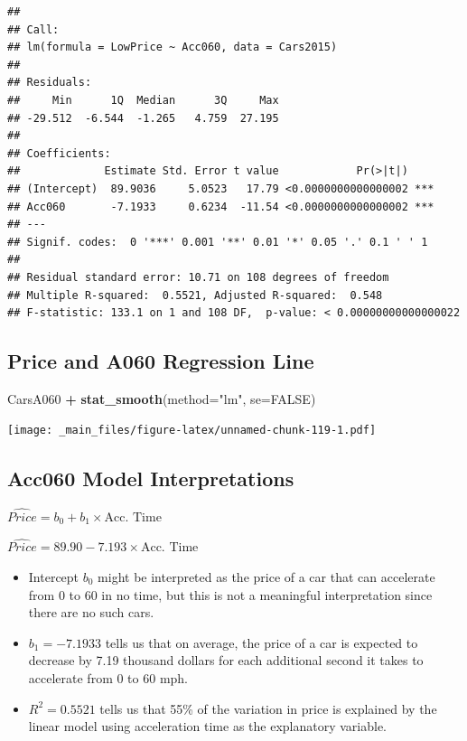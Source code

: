 \documentclass[]{book}
\newenvironment{Shaded}{\begin{snugshade}}{\end{snugshade}}
\newcommand{\KeywordTok}[1]{\textcolor[rgb]{0.13,0.29,0.53}{\textbf{#1}}}
\newcommand{\DataTypeTok}[1]{\textcolor[rgb]{0.13,0.29,0.53}{#1}}
\newcommand{\StringTok}[1]{\textcolor[rgb]{0.31,0.60,0.02}{#1}}
\newcommand{\OtherTok}[1]{\textcolor[rgb]{0.56,0.35,0.01}{#1}}
\newcommand{\OperatorTok}[1]{\textcolor[rgb]{0.81,0.36,0.00}{\textbf{#1}}}
\newcommand{\NormalTok}[1]{#1}
\begin{document}
\begin{verbatim}
## 
## Call:
## lm(formula = LowPrice ~ Acc060, data = Cars2015)
## 
## Residuals:
##     Min      1Q  Median      3Q     Max 
## -29.512  -6.544  -1.265   4.759  27.195 
## 
## Coefficients:
##             Estimate Std. Error t value            Pr(>|t|)    
## (Intercept)  89.9036     5.0523   17.79 <0.0000000000000002 ***
## Acc060       -7.1933     0.6234  -11.54 <0.0000000000000002 ***
## ---
## Signif. codes:  0 '***' 0.001 '**' 0.01 '*' 0.05 '.' 0.1 ' ' 1
## 
## Residual standard error: 10.71 on 108 degrees of freedom
## Multiple R-squared:  0.5521, Adjusted R-squared:  0.548 
## F-statistic: 133.1 on 1 and 108 DF,  p-value: < 0.00000000000000022
\end{verbatim}

\subsection{Price and A060 Regression
Line}\label{price-and-a060-regression-line}

\begin{Shaded}
\begin{Highlighting}[]
\NormalTok{CarsA060 }\OperatorTok{+}\StringTok{ }\KeywordTok{stat_smooth}\NormalTok{(}\DataTypeTok{method=}\StringTok{"lm"}\NormalTok{, }\DataTypeTok{se=}\OtherTok{FALSE}\NormalTok{)}
\end{Highlighting}
\end{Shaded}

\texttt{[image: \_main\_files/figure-latex/unnamed-chunk-119-1.pdf]}

\subsection{Acc060 Model
Interpretations}\label{acc060-model-interpretations}

\(\widehat{Price} = b_0 + b_1\times\text{Acc. Time}\)

\(\widehat{Price} = 89.90 - 7.193\times\text{Acc. Time}\)

\begin{itemize}
\item
  Intercept \(b_0\) might be interpreted as the price of a car that can
  accelerate from 0 to 60 in no time, but this is not a meaningful
  interpretation since there are no such cars.
\item
  \(b_1=-7.1933\) tells us that on average, the price of a car is
  expected to decrease by 7.19 thousand dollars for each additional
  second it takes to accelerate from 0 to 60 mph.
\item
  \(R^2 = 0.5521\) tells us that 55\% of the variation in price is
  explained by the linear model using acceleration time as the
  explanatory variable.
\end{itemize}
\end{document}
